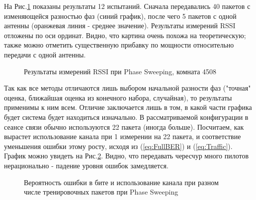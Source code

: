 \documentclass[a4paper,12pt,oneside, abstract=true]{scrartcl}
\begin{document}
На Рис.\ref{fig:4508} показаны результаты 12 испытаний. 
Сначала передавались 40 пакетов с изменяющейся разностью фаз (синий график), после чего 5 пакетов с одной антенны (оранжевая линия - среднее значение). 
Результаты измерений RSSI отложены по оси ординат. 
Видно, что картина очень похожа на теоретическую; также можно отметить существенную прибавку по мощности относительно передачи с одной антенны.
\begin{figure}[H]
\caption{Результаты измерений RSSI при Phase Sweeping, комната 4508}
\label{fig:4508}
\end{figure}

Так как все методы отличаются лишь выбором начальной разности фаз ("точная" оценка, ближайшая оценка из конечного набора, случайная), то результаты применимы к ним всем. Отличие заключается лишь в том, в какой части графика будет система будет находиться изначально.
В рассматриваемой конфигурации в сеансе связи обычно используются 22 пакета (иногда больше). 
Посчитаем, как вырастет использование канала при 1 измерении на 22 пакета, и соответствие уменьшения ошибки этому росту, исходя из (\ref{eq:FullBER}) и (\ref{eq:Traffic}). 
График можно увидеть на Рис.\ref{fig:BERvsChannel}. Видно, что передавать чересчур много пилотов нерационально - падение уровня ошибок замедляется.

\begin{figure}[h!]
\caption{Вероятность ошибки в бите и использование канала при разном числе тренировочных пакетов при Phase Sweeping}
\label{fig:BERvsChannel}
\end{figure}
\end{document}

